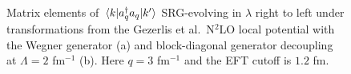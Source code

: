 \documentclass[preprintnumbers,floatfix,aps,prc,preprint,nofootinbib]{revtex4-1}
\begin{document}
\begin{figure}[H]
	\centering
	
	\caption{Matrix elements of $\mel{k}{a^{\dagger}_q a_q}{k'}$ SRG-evolving in $\lambda$ right to left under transformations from the Gezerlis et al.~N$^2$LO local potential with the Wegner generator (a) and block-diagonal generator decoupling at $\Lambda=2$ fm$^{-1}$ (b). Here $q=3$ fm$^{-1}$ and the EFT cutoff is $1.2$ fm.}
	\label{momentum_projection_contours_q3,00_kvnn224}
\end{figure}





\end{document}
